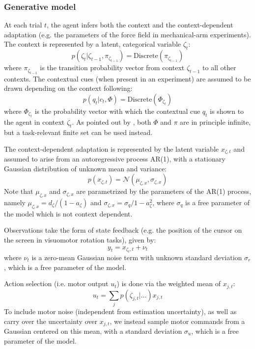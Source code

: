 \documentclass[a4paper,doc,floatsintext,natbib]{apa6}
\begin{document}
\subsubsection{Generative model}
At each trial $t$, the agent infers both the context and the context-dependent adaptation (e.g. the parameters of the force field in mechanical-arm experiments). The context is represented by a latent, categorical variable $\zeta_t$:
\begin{equation}
p(\zeta_t | \zeta_{t-1}, \pi_{\zeta_{t-1}}) = \text{Discrete}\left(\pi_{\zeta_{t-1}}\right)
\end{equation}
where $\pi_{\zeta_{t-1}}$ is the transition probability vector from context $\zeta_{t-1}$ to all other contexts. The contextual cues (when present in an experiment) are assumed to be drawn depending on the context following:
\begin{equation}
p(q_t | c_t, \Phi) = \text{Discrete}(\Phi_{\zeta_t})
\end{equation}
where $\Phi_{\zeta_t}$ is the probability vector with which the contextual cue $q_t$ is shown to the agent in context $\zeta_t$. As pointed out by \cite{Heald_Contextual_2021}, both $\Phi$ and $\pi$ are in principle infinite, but a task-relevant finite set can be used instead.

The context-dependent adaptation is represented by the latent variable $x_{\zeta,t}$ and assumed to arise from an autoregressive process AR(1), with a stationary Gaussian distribution of unknown mean and variance:
\begin{equation}
p(x_{\zeta,t}) = \mathcal{N}(\mu_{\zeta,x}, \sigma_{\zeta, x})
\end{equation}
Note that $\mu_{\zeta, x}$ and $\sigma_{\zeta,x}$ are parametrized by the parameters of the AR(1) process, namely $\mu_{\zeta,x} = d_\zeta / (1 - a_\zeta)$ and $\sigma_{\zeta, x} = \sigma_q / 1 - a_\zeta^2$, where $\sigma_q$ is a free parameter of the model which is not context dependent.

Observations take the form of state feedback (e.g. the position of the cursor on the screen in visuomotor rotation tasks), given by:
\begin{equation}
y_t = x_{\zeta_t, t} + \nu_t
\end{equation}
where $\nu_t$ is a zero-mean Gaussian noise term with unknown standard deviation $\sigma_r$, which is a free parameter of the model.

Action selection (i.e. motor output $u_t$) is done via the weighted mean of $x_{j,t}$:
\begin{equation}
u_t  = \displaystyle\sum_{j}p(\zeta_{j,t} | ...) x_{j,t} \label{eqn:dist-comm}
\end{equation}
To include motor noise (independent from estimation uncertainty), as well as carry over the uncertainty over $x_{j,t}$, we instead sample motor commands from a Gaussian centered on this mean, with a standard deviation $\sigma_u$, which is a free parameter of the model.
\end{document}
